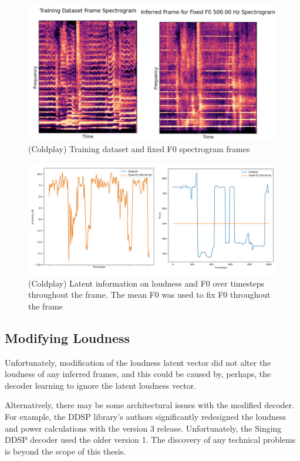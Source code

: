 \begin{figure}[H]
    \centering
    \includegraphics[width=\textwidth]{research/results/Coldplay/FixedF0.png}
    \caption{(Coldplay) Training dataset and fixed F0 spectrogram frames}
\end{figure}

\begin{figure}[H]
    \centering
    \includegraphics[width=\textwidth]{research/results/Coldplay/FixedF0Graphs.png}
    \caption{(Coldplay) Latent information on loudness and F0 over timesteps throughout the frame. The mean F0 was used to fix F0 throughout the frame}
\end{figure}

\subsection{Modifying Loudness}

Unfortunately, modification of the loudness latent vector did not alter the loudness of any inferred frames, and this could be caused by, perhaps, the decoder learning to ignore the latent loudness vector.

Alternatively, there may be some architectural issues with the modified decoder. For example, the DDSP library's authors significantly redesigned the loudness and power calculations with the version 3 release. Unfortunately, the Singing DDSP decoder used the older version 1. The discovery of any technical problems is beyond the scope of this thesis.

